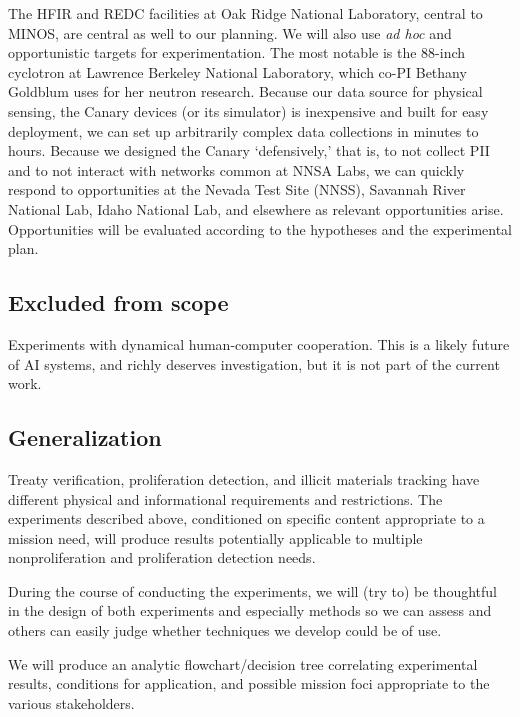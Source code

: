 \documentclass{article} %
\begin{document}
The HFIR and REDC facilities at Oak Ridge National Laboratory, central to MINOS, are central as well to our planning. We will also use \textit{ad hoc} and opportunistic targets for experimentation. The most notable is the 88-inch cyclotron at Lawrence Berkeley National Laboratory, which co-PI Bethany Goldblum uses for her neutron research. Because our data source for physical sensing, the Canary devices (or its simulator) is inexpensive and built for easy deployment, we can set up arbitrarily complex data collections in minutes to hours. Because we designed the Canary `defensively,' that is, to not collect PII and to not interact with networks common at NNSA Labs, we can quickly respond to opportunities at the Nevada Test Site (NNSS), Savannah River National Lab, Idaho National Lab, and elsewhere as relevant opportunities arise. Opportunities will be evaluated according to the hypotheses and the experimental plan.

\subsection{Excluded from scope}
Experiments with dynamical human-computer cooperation. This is a likely future of AI systems, and richly deserves investigation, but it is not part of the current work.

\subsection{Generalization}
Treaty verification, proliferation detection, and illicit materials tracking have different physical and informational requirements and restrictions. The experiments described above, conditioned on specific content appropriate to a mission need, will produce results potentially applicable to multiple nonproliferation and proliferation detection needs.

During the course of conducting the experiments, we will (try to) be thoughtful in the design of both experiments and especially methods so we can assess and others can easily judge whether techniques we develop could be of use.

We will produce an analytic flowchart/decision tree correlating experimental results, conditions for application, and possible mission foci appropriate to the various stakeholders.


\vspace{20 pt}
\begin{center}
\end{center}
\vspace{20 pt}
\end{document}
